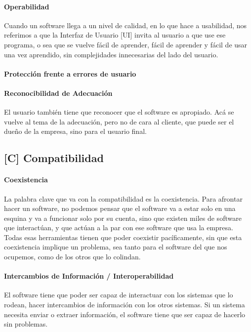 \paragraph{Operabilidad}
  Cuando un software llega a un nivel de calidad, en lo que hace a usabilidad, nos
  referimos a que la Interfaz de Usuario {[}UI{]} invita al usuario a
  que use ese programa, o sea que se vuelve fácil de aprender, fácil de
  aprender y fácil de usar una vez aprendido, sin complejidades
  innecesarias del lado del usuario.
\paragraph{Protección frente a errores de usuario}
\paragraph{Reconocibilidad de Adecuación}
  El usuario también tiene que
  reconocer que el software es apropiado. Acá se vuelve al tema de la
  adecuación, pero no de cara al cliente, que puede ser el dueño de la
  empresa, sino para el usuario final.


\hypertarget{compatibilidad-c}{%
\subsection{%
{[}C{]}
Compatibilidad
}\label{compatibilidad-c}}


\hypertarget{coexistencia}{%
\paragraph{Coexistencia}\label{coexistencia}}
La palabra clave que va con la compatibilidad
  es la coexistencia. Para afrontar hacer un software, no podemos pensar
  que el software va a estar solo en una esquina y va a funcionar solo
  por su cuenta, sino que existen miles de software que interactúan, y
  que actúan a la par con ese software que usa la empresa. Todas esas
  herramientas tienen que poder coexistir pacíficamente, sin que esta
  coexistencia implique un problema, sea tanto para el software del que
  nos ocupemos, como de los otros que lo colindan.
\hypertarget{intercambios}{%
\paragraph{Intercambios de Información / Interoperabilidad}\label{intercambios}}
El software tiene que poder ser
  capaz de interactuar con los sistemas que lo rodean, hacer
  intercambios de información con los otros sistemas. Si un sistema
  necesita enviar o extraer información, el software tiene que ser capaz
  de hacerlo sin problemas.



